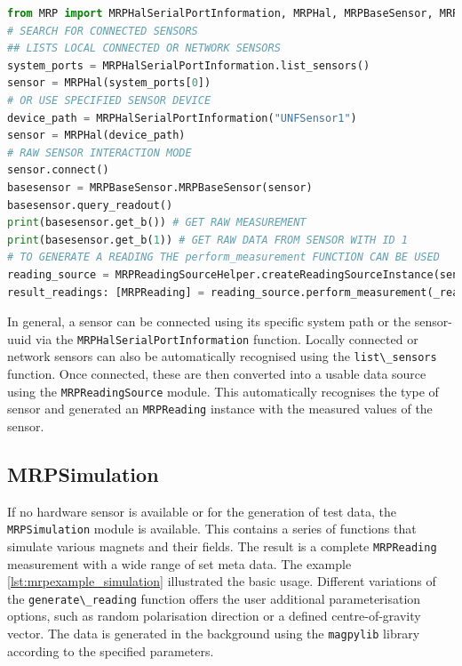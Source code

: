 \begin{lstlisting}[language=Python, caption={MRPHal example to use an connected hardware sensor to store readings inside of an measurement}, label=lst:mrpexample_hal]
from MRP import MRPHalSerialPortInformation, MRPHal, MRPBaseSensor, MRPReadingSource
# SEARCH FOR CONNECTED SENSORS
## LISTS LOCAL CONNECTED OR NETWORK SENSORS
system_ports = MRPHalSerialPortInformation.list_sensors()
sensor = MRPHal(system_ports[0])
# OR USE SPECIFIED SENSOR DEVICE
device_path = MRPHalSerialPortInformation("UNFSensor1")
sensor = MRPHal(device_path)
# RAW SENSOR INTERACTION MODE
sensor.connect()
basesensor = MRPBaseSensor.MRPBaseSensor(sensor)
basesensor.query_readout()
print(basesensor.get_b()) # GET RAW MEASUREMENT
print(basesensor.get_b(1)) # GET RAW DATA FROM SENSOR WITH ID 1
# TO GENERATE A READING THE perform_measurement FUNCTION CAN BE USED
reading_source = MRPReadingSourceHelper.createReadingSourceInstance(sensor)
result_readings: [MRPReading] = reading_source.perform_measurement(_readings=1, _hwavg=1)
\end{lstlisting}

In general, a sensor can be connected using its specific system path or
the sensor-\gls{uuid} via the
\passthrough{\lstinline!MRPHalSerialPortInformation!} function. Locally
connected or network sensors can also be automatically recognised using
the \passthrough{\lstinline!list\_sensors!} function. Once connected,
these are then converted into a usable data source using the
\passthrough{\lstinline!MRPReadingSource!} module. This automatically
recognises the type of sensor and generated an
\passthrough{\lstinline!MRPReading!} instance with the measured values
of the sensor.

\hypertarget{mrpsimulation}{%
\subsection{MRPSimulation}\label{mrpsimulation}}

If no hardware sensor is available or for the generation of test data,
the \passthrough{\lstinline!MRPSimulation!} module is available. This
contains a series of functions that simulate various magnets and their
fields. The result is a complete \passthrough{\lstinline!MRPReading!}
measurement with a wide range of set meta data. The example
\ref{lst:mrpexample_simulation} illustrated the basic usage. Different
variations of the \passthrough{\lstinline!generate\_reading!} function
offers the user additional parameterisation options, such as random
polarisation direction or a defined centre-of-gravity vector. The data
is generated in the background using the
\passthrough{\lstinline!magpylib!}\cite{ortner2020magpylib} library
according to the specified parameters.


